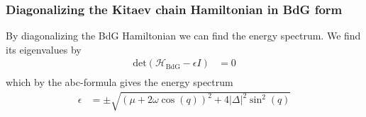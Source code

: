 \subsubsection{Diagonalizing the Kitaev chain Hamiltonian in BdG form}
By diagonalizing the BdG Hamiltonian we can find the energy spectrum. We find its eigenvalues by
\begin{align}
    \text{det}\left( \mathcal{H}_\text{BdG} - \epsilon I \right) &= 0\\ 
\end{align}
which by the abc-formula gives the energy spectrum
\begin{align}
    \epsilon &= \pm \sqrt{\left(\mu + 2 \omega \cos(q)\right)^2 + 4 |\Delta|^2 \sin^2(q)}
\end{align}




